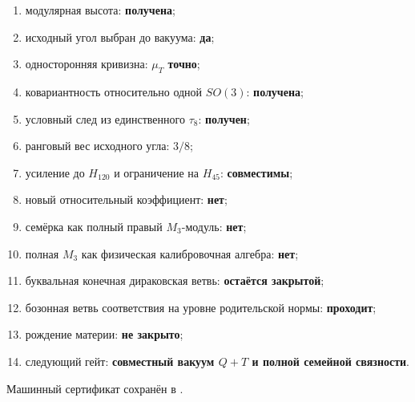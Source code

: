 \begin{protocol}
\begin{enumerate}
 \item модулярная высота: \textbf{получена};
 \item исходный угол выбран до вакуума: \textbf{да};
 \item односторонняя кривизна: \textbf{$\mu_T$ точно};
 \item ковариантность относительно одной $SO(3)$: \textbf{получена};
 \item условный след из единственного $\tau_8$: \textbf{получен};
 \item ранговый вес исходного угла: \textbf{$3/8$};
 \item усиление до $H_{120}$ и ограничение на $H_{45}$:
 \textbf{совместимы};
 \item новый относительный коэффициент: \textbf{нет};
 \item семёрка как полный правый $M_3$-модуль: \textbf{нет};
 \item полная $M_3$ как физическая калибровочная алгебра: \textbf{нет};
 \item буквальная конечная дираковская ветвь: \textbf{остаётся закрытой};
 \item бозонная ветвь соответствия на уровне родительской нормы:
 \textbf{проходит};
 \item рождение материи: \textbf{не закрыто};
 \item следующий гейт: \textbf{совместный вакуум $Q+T$ и полной
 семейной связности}.
\end{enumerate}
\end{protocol}

Машинный сертификат сохранён в
.